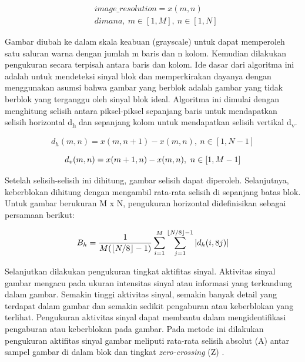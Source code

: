 \begin{equation} 
	\label{eq3-1}
	\begin{split}
		&image\_resolution = x(m,n) \\
		&dimana, \ m \in \left[ 1,M \right], \ n\in \left[ 1,N \right]
	\end{split}
\end{equation}

Gambar diubah ke dalam skala keabuan (grayscale) untuk dapat memperoleh satu saluran warna dengan jumlah m baris dan n kolom. Kemudian dilakukan pengukuran secara terpisah antara baris dan kolom. Ide dasar dari algoritma ini adalah untuk mendeteksi sinyal blok dan memperkirakan dayanya dengan menggunakan asumsi bahwa gambar yang berblok adalah gambar yang tidak berblok yang terganggu oleh sinyal blok ideal. Algoritma ini dimulai dengan menghitung selisih antara piksel-piksel sepanjang baris untuk mendapatkan selisih horizontal d\textsubscript{h} dan sepanjang kolom untuk mendapatkan selisih vertikal d\textsubscript{v}. 

\begin{equation} 
	\label{eq3-2}
	d_{h}(m,n)=x(m,n+1)-x(m,n), \ n\in [1, N-1] 
\end{equation}

\begin{equation} 
	\label{eq3-3}
	d_{v}(m,n)=x(m+1,n)-x(m,n), \ n\in [1, M-1]
	\vspace{0.5cm}
\end{equation}

Setelah selisih-selisih ini dihitung, gambar selisih dapat diperoleh. Selanjutnya, keberblokan dihitung dengan mengambil rata-rata selisih di sepanjang batas blok. Untuk gambar berukuran M x N, pengukuran horizontal didefinisikan sebagai persamaan berikut:

\begin{equation} 
	\label{eq3-4}
	B_{h}=\frac{1}{M(\left\lfloor N/8 \right\rfloor-1)}\sum_{i=1}^{M}\sum_{j=1}^{\left\lfloor N/8 \right\rfloor-1}\left| d_h(i,8j) \right|
	\vspace{0.5cm}
\end{equation}

Selanjutkan dilakukan pengukuran tingkat aktifitas sinyal. Aktivitas sinyal gambar mengacu pada ukuran intensitas sinyal atau informasi yang terkandung dalam gambar. Semakin tinggi aktivitas sinyal, semakin banyak detail yang terdapat dalam gambar dan semakin sedikit pengaburan atau keberblokan yang terlihat. Pengukuran aktivitas sinyal dapat membantu dalam mengidentifikasi pengaburan atau keberblokan pada gambar. Pada metode ini dilakukan pengukuran aktifitas sinyal gambar meliputi rata-rata selisih absolut (A) antar sampel gambar di dalam blok dan tingkat  \textit{zero-crossing}  (Z) \citep{Wang2002}.


